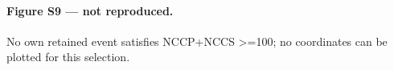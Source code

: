 \paragraph{Figure S9 --- not reproduced.} No own retained event satisfies NCCP+NCCS >=100; no coordinates can be plotted for this selection.
